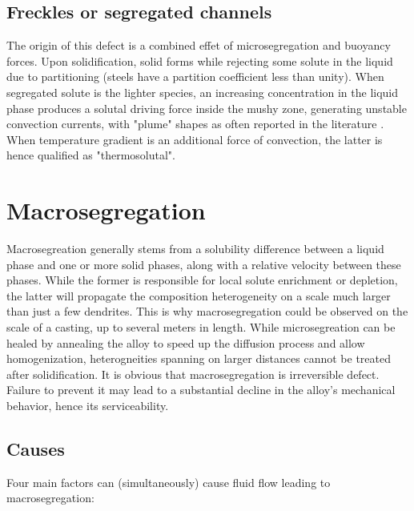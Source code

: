 \subsection*{Freckles or segregated channels} 
%
The origin of this defect is a combined effet of microsegregation and buoyancy forces. 
Upon solidification, solid forms while rejecting some solute in the liquid due to partitioning 
(steels have a partition coefficient less than unity).
When segregated solute is the lighter species, an increasing concentration in the liquid phase 
produces a solutal driving force inside the mushy zone, generating unstable convection currents, 
with "plume" shapes as often reported in the literature \citep{sarazin_studies_1992, schneider_modeling_1997,
shevchenko_chimney_2013}. When temperature gradient is an additional force of convection, the latter is hence 
qualified as "thermosolutal".
%
\section{Macrosegregation}
%
Macrosegreation generally stems from a solubility difference between a liquid phase and one or more solid phases, along with
a relative velocity between these phases. While the former is responsible for local solute enrichment or depletion, the latter
will propagate the composition heterogeneity on a scale much larger than just a few dendrites.
This is why macrosegregation could be observed on the scale of a casting, up to several meters in length. 
While microsegreation can be healed by annealing the alloy to speed up the diffusion process and allow homogenization, heterogneities 
spanning on larger distances cannot be treated after solidification. It is obvious that macrosegregation is irreversible defect. 
Failure to prevent it may lead to a substantial decline in the alloy's mechanical behavior, hence its serviceability.
%
%
\subsection{Causes}
Four main factors can (simultaneously) cause fluid flow leading to macrosegregation:
%
%
